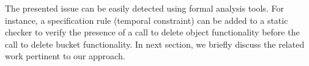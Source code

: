 The presented issue can be easily detected using formal analysis tools.
For instance, a specification rule (temporal constraint) can be added to a static checker to verify
the presence of a call to delete object functionality before the call to delete bucket functionality.
In next section, we briefly discuss the related work pertinent to our approach.
 








